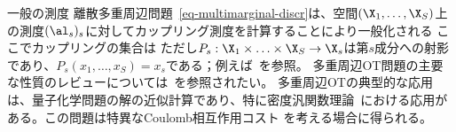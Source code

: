 \begin{rem2}{一般の測度}
離散多重周辺問題~\eqref{eq-multimarginal-discr}は、空間$(\X_1,\ldots,\X_S)$上の測度$(\al_s)_s$に対してカップリング測度を計算することにより一般化される
ここでカップリングの集合は
ただし$P_s : \X_1 \times \ldots \times \X_S \rightarrow \X_s$は第$s$成分への射影であり、$P_s(x_1,\ldots,x_S)=x_s$である；例えば~\citep{GangboSciech}を参照。
%
多重周辺OT問題の主要な性質のレビューについては~\citep{PassMultiReview,PassMultiMarginalStructure}を参照されたい。
%
多重周辺OTの典型的な応用は、量子化学問題の解の近似計算であり、特に密度汎関数理論~\citep{CotarDFT,GorSeiVig,BuDePGor}における応用がある。この問題は特異なCoulomb相互作用コスト
を考える場合に得られる。
\end{rem2}



